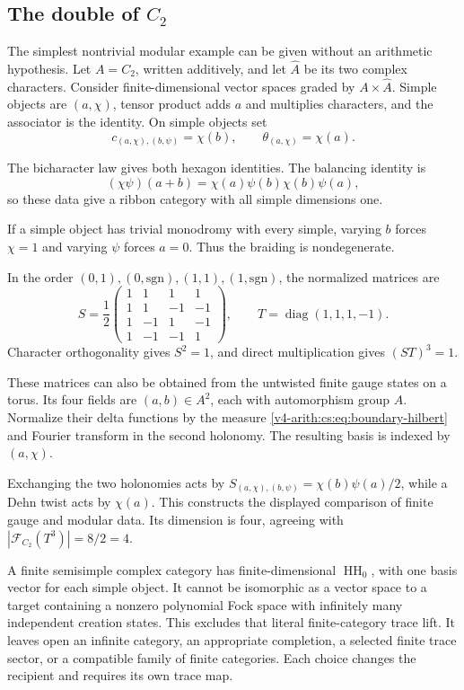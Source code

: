\subsection{The double of \(C_2\)}

The simplest nontrivial modular example can be given without an arithmetic
hypothesis. Let \(A=C_2\), written additively, and let \(\widehat A\) be its
two complex characters. Consider finite-dimensional vector spaces graded by
\(A\times\widehat A\). Simple objects are \((a,\chi)\), tensor product adds
\(a\) and multiplies characters, and the associator is the identity. On
simple objects set
\[
 c_{(a,\chi),(b,\psi)}=\chi(b),\qquad
 \theta_{(a,\chi)}=\chi(a).
\]

The bicharacter law gives both hexagon identities. The balancing identity is
\[
 (\chi\psi)(a+b)
       =\chi(a)\psi(b)\chi(b)\psi(a),
\]
so these data give a ribbon category with all simple dimensions one.

If a simple object has trivial monodromy with every simple, varying \(b\) forces
\(\chi=1\) and varying \(\psi\) forces \(a=0\). Thus the braiding is
nondegenerate.

In the order \((0,1),(0,\mathrm{sgn}),(1,1),(1,\mathrm{sgn})\), the
normalized matrices are
\begin{equation}
 S=\frac12
 \begin{pmatrix}
 1&1&1&1\\1&1&-1&-1\\1&-1&1&-1\\1&-1&-1&1
 \end{pmatrix},
 \qquad
 T=\operatorname{diag}(1,1,1,-1).
 \label{v4-arith:cs:eq:c2-modular}
\end{equation}
Character orthogonality gives \(S^2=1\), and direct multiplication gives
\((ST)^3=1\).

These matrices can also be obtained from the untwisted finite gauge states
on a torus. Its four fields are \((a,b)\in A^2\), each with automorphism
group \(A\). Normalize their delta functions by the measure
\eqref{v4-arith:cs:eq:boundary-hilbert} and Fourier transform in the second
holonomy. The resulting basis is indexed by \((a,\chi)\).

Exchanging the two holonomies acts by
\(S_{(a,\chi),(b,\psi)}=\chi(b)\psi(a)/2\), while a Dehn twist acts by
\(\chi(a)\). This constructs the displayed comparison of finite gauge and
modular data. Its dimension is four, agreeing with \(|\mathcal
F_{C_2}(T^3)|=8/2=4\).

A finite semisimple complex category has finite-dimensional
\(\operatorname{HH}_0\), with one basis vector for each simple object. It
cannot be isomorphic as a vector space to a target containing a nonzero
polynomial Fock space with infinitely many independent creation states. This
excludes that literal finite-category trace lift. It leaves open an infinite
category, an appropriate completion, a selected finite trace sector, or a
compatible family of finite categories. Each choice changes the recipient
and requires its own trace map.

